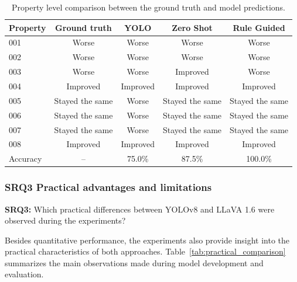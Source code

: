 \begin{table}[ht]
\centering
\caption{Property level comparison between the ground truth and model predictions.}
\label{tab:propertycomparison}
\footnotesize
\begin{tabular}{lcccc}
\toprule
Property & Ground truth & YOLO & Zero Shot & Rule Guided \\
\midrule
001 & Worse & Worse & Worse & Worse \\
002 & Worse & Worse & Worse & Worse \\
003 & Worse & Worse & Improved & Worse \\
004 & Improved & Improved & Improved & Improved \\
005 & Stayed the same & Worse & Stayed the same & Stayed the same \\
006 & Stayed the same & Worse & Stayed the same & Stayed the same \\
007 & Stayed the same & Worse & Stayed the same & Stayed the same \\
008 & Improved & Improved & Improved & Improved \\
\midrule
Accuracy & -- & 75.0\% & 87.5\% & 100.0\% \\
\bottomrule
\end{tabular}
\end{table}
\subsubsection{SRQ3 Practical advantages and limitations}

\textbf{SRQ3:} Which practical differences between YOLOv8 and LLaVA 1.6 were observed during the experiments?

Besides quantitative performance, the experiments also provide insight into the practical characteristics of both approaches. Table~\ref{tab:practical_comparison} summarizes the main observations made during model development and evaluation.

